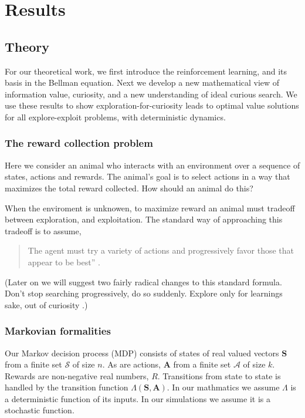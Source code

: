\section*{Results} 
\subsection*{Theory}
For our theoretical work, we first introduce the reinforcement learning, and its basis in the Bellman equation. Next we develop a new mathematical view of information value, curiosity, and a new understanding of ideal curious search. We use these results to show exploration-for-curiosity leads to optimal value solutions for all explore-exploit problems, with deterministic dynamics.


\subsubsection*{The reward collection problem}
Here we consider an animal who interacts with an environment over a sequence of states, actions and rewards. The animal's goal is to select actions in a way that maximizes the total reward collected. How should an animal do this? 

When the enviroment is unknowen, to maximize reward an animal must tradeoff between exploration, and exploitation. The standard way of approaching this tradeoff is to assume, 

\begin{quote}
The agent must try a variety of actions and progressively favor those that appear to be best'' \cite{Sutton2018}. 
\end{quote}

(Later on we will suggest two fairly radical changes to this standard formula. Don’t stop searching progressively, do so suddenly. Explore only for learnings sake, out of curiosity \citep{Kidd2015}.)


\subsubsection*{Markovian formalities}
Our Markov decision process (MDP) consists of states of real valued vectors $\mathbf{S}$ from a finite set $\mathcal{S}$ of size $n$. As are actions, $\mathbf{A}$ from a finite set $\mathcal{A}$ of size $k$. Rewards are non-negative real numbers, $R$. Transitions from state to state is handled by the transition function $\Lambda(\mathbf{S},\mathbf{A})$. In our mathmatics we assume $\Lambda$ is a deterministic function of its inputs. In our simulations we assume it is a stochastic function.


